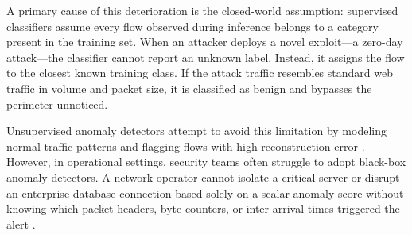 \documentclass[10pt,journal,compsoc]{IEEEtran}
\begin{document}
A primary cause of this deterioration is the closed-world assumption: supervised classifiers assume every flow observed during inference belongs to a category present in the training set. When an attacker deploys a novel exploit—a zero-day attack—the classifier cannot report an unknown label. Instead, it assigns the flow to the closest known training class. If the attack traffic resembles standard web traffic in volume and packet size, it is classified as benign and bypasses the perimeter unnoticed.

Unsupervised anomaly detectors attempt to avoid this limitation by modeling normal traffic patterns and flagging flows with high reconstruction error \cite{shone2018, yue2022, wu2023}. However, in operational settings, security teams often struggle to adopt black-box anomaly detectors. A network operator cannot isolate a critical server or disrupt an enterprise database connection based solely on a scalar anomaly score without knowing which packet headers, byte counters, or inter-arrival times triggered the alert \cite{doshi2020}.
\end{document}
